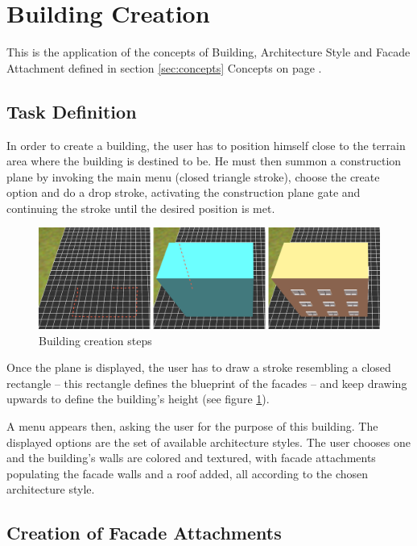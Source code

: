 
\section{Building Creation}

This is the application of the concepts of Building, Architecture Style and
Facade Attachment defined in section \ref{sec:concepts} Concepts on page \pageref{sec:concepts}.

\subsection{Task Definition}

In order to create a building, the user has to position himself close to the terrain area
where the building is destined to be.
He must then summon a construction plane by invoking the main menu (closed triangle stroke),
choose the create option and do a drop stroke, activating the construction plane gate and
continuing the stroke until the desired position is met.

\begin{figure}[!ht]
		\centering
		\includegraphics[width=14cm]{gfx/building-creation.png}
		\caption{Building creation steps}
		\label{fig:building-creation}
\end{figure}


Once the plane is displayed, the user has to draw a stroke resembling a closed rectangle
-- this rectangle defines the blueprint of the facades --
and keep drawing upwards to define the building's height (see figure \ref{fig:building-creation}).

A menu appears then, asking the user for the purpose of this building.
The displayed options are the set of available architecture styles.
The user chooses one and the building's walls are colored and textured,
with facade attachments populating the facade walls and a roof added,
all according to the chosen architecture style.


\subsection{Creation of Facade Attachments}

